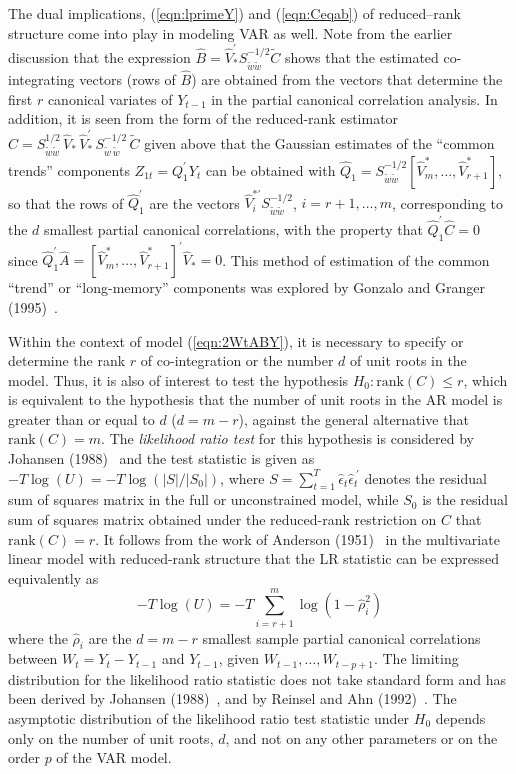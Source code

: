 The dual implications, (\ref{eqn:lprimeY}) and (\ref{eqn:Ceqab}) of reduced--rank structure come into play in modeling VAR as well. Note from the earlier discussion that the expression $\hat{B} = \hat{V}_*^{\prime} S_{\tilde{w} \tilde{w}}^{-1/2} \tilde{C}$ shows that the estimated co-integrating vectors (rows of $\hat{B}$) are obtained from the vectors that determine the first $r$ canonical variates of $Y_{t-1}$ in the partial canonical correlation analysis. In addition, it is seen from the form of the reduced-rank estimator $\hat{C} = S_{\tilde{w} \tilde{w}}^{1/2} \,\hat{V}_* \,\hat{V}_*^{\prime} \,S_{\tilde{w} \,\tilde{w}}^{-1/2} \,\tilde{C}$ given above that the Gaussian estimates of the ``common trends'' components $Z_{1t} = Q_1^{\prime} Y_t$ can be obtained with $\hat{Q}_1 = S_{\tilde{w} \tilde{w}}^{-1/2} [\hat{V}_m^* ,\ldots, \hat{V}_{r+1}^* ]$, so that the rows of $\hat{Q}_1^{\prime}$ are the vectors $\hat{V}_i^{* \prime} S_{\tilde{w} \tilde{w}}^{-1/2}$, $i = r\!+\!1 ,\ldots,m$, corresponding to the $d$ smallest partial canonical correlations, with the property that $\hat{Q}_1^{\prime} \hat{C} = 0$ since $\hat{Q}_1^{\prime} \hat{A} = [\hat{V}_m^* ,\ldots, \hat{V}_{r+1}^* ]^{\prime} \hat{V}_* = 0$. This method of estimation of the common ``trend'' or ``long-memory'' components was explored by Gonzalo and Granger (1995)~\cite{gongra}.


Within the context of model (\ref{eqn:2WtABY}), it is necessary to specify or determine the rank $r$ of co-integration or the number $d$ of unit roots in the model. Thus, it is also of interest to test the hypothesis $H_0\!:\!\mbox{rank} (C) \leq r$, which is equivalent to the hypothesis that the number of unit roots in the AR model is greater than or equal to $d$ ($d = m\!-\!r$), against the general alternative that $\mbox{rank} (C) = m$.  The {\it likelihood ratio test} for this hypothesis is considered by Johansen (1988)~\cite{johansen1988statistical} and the test statistic is given as $- T \log (U) = - T \log ( \left|S \right| / \left| S_0 \right| )$, where $S = \sum_{t=1}^T \hat{\epsilon}_t \hat{\epsilon}_t^{\: \prime} $ denotes the residual sum of squares matrix in the full or unconstrained model, while $S_0 $ is the residual sum of squares matrix obtained under the reduced-rank restriction on $C$ that $\mbox{rank} (C) = r $.  It follows from the work of Anderson (1951)~\cite{andersontw} in the multivariate linear model with reduced-rank structure that the LR statistic can be expressed equivalently as
	\begin{equation}\label{eqn:2negT}
	- T \log (U) = - T \sum_{i=r+1}^m \log ( 1 - \hat{\rho}_i^2 )
	\end{equation}
where the $\hat{\rho}_i$ are the $d = m\!-\!r$ smallest sample partial canonical correlations between $W_t = Y_t - Y_{t-1} $ and $Y_{t-1}$, given $W_{t-1} ,\ldots, W_{t-p+1}$. The limiting distribution for the likelihood ratio statistic does not take standard form and has been derived by Johansen (1988)~\cite{johansen1988statistical}, and by Reinsel and Ahn (1992)~\cite{reinsel1992vector}. The asymptotic distribution of the likelihood ratio test statistic under $H_0$ depends only on the number of unit roots, $d$, and not on any other parameters or on the order $p$ of the VAR model.


